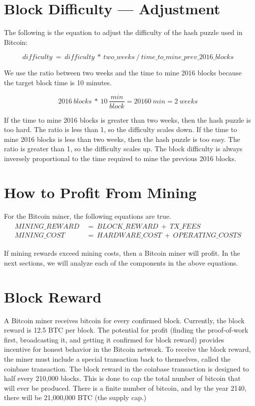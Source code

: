 \documentclass[11pt]{article}
\begin{document}
    \section*{Block Difficulty --- Adjustment}
    
    \noindent The following is the equation to adjust the difficulty of the hash puzzle used in Bitcoin:
    
    $$\mathit{difficulty}~=~\mathit{difficulty~*~two\_weeks~/~time\_to\_mine\_prev\_2016\_blocks}$$
    
    We use the ratio between two weeks and the time to mine 2016 blocks because the target block time is 10 minutes. 
    
    $$\mathit{2016~blocks~*~10~\frac{min}{block}=20160~min=2~weeks}$$
    
    If the time to mine 2016 blocks is greater than two weeks, then the hash puzzle is too hard. The ratio is less than 1, so the difficulty scales down. If the time to mine 2016 blocks is less than two weeks, then the hash puzzle is too easy. The ratio is greater than 1, so the difficulty scales up. The block difficulty is always inversely proportional to the time required to mine the previous 2016 blocks.
    
    \section*{How to Profit From Mining}
    
    For the Bitcoin miner, the following equations are true.
    \begin{align*}
        \begin{split}
            MINING\_REWARD~&=~BLOCK\_REWARD~+~TX\_FEES \\
            MINING\_COST~&=~HARDWARE\_COST~+~OPERATING\_COSTS
        \end{split}
    \end{align*}
    
    If mining rewards exceed mining costs, then a Bitcoin miner will profit. In the next sections, we will analyze each of the components in the above equations.
    
    \section*{Block Reward}
    
    A Bitcoin miner receives bitcoin for every confirmed block. Currently, the block reward is 12.5 BTC per block. The potential for profit (finding the proof-of-work first, broadcasting it, and getting it confirmed for block reward) provides incentive for honest behavior in the Bitcoin network. To receive the block reward, the miner must include a special transaction back to themselves, called the coinbase transaction. The block reward in the coinbase transaction is designed to half every 210,000 blocks. This is done to cap the total number of bitcoin that will ever be produced. There is a finite number of bitcoin, and by the year 2140, there will be 21,000,000 BTC (the supply cap.)
    
\end{document}
